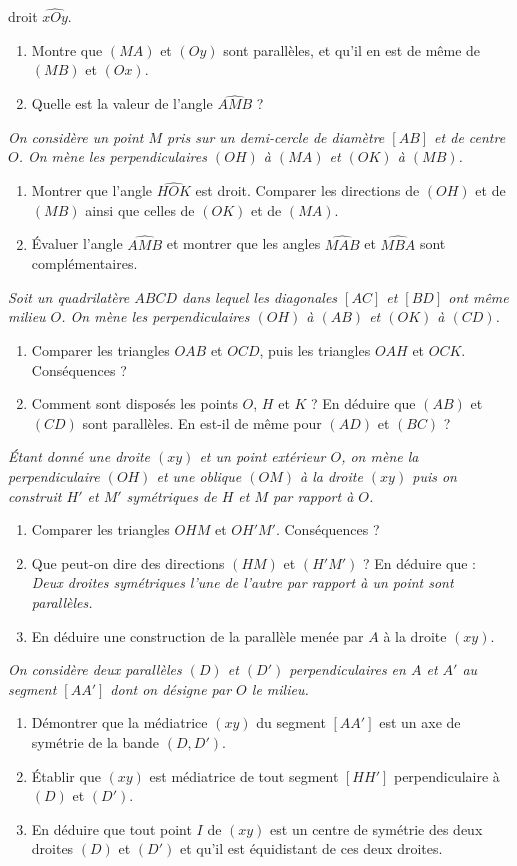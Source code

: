 \begin{itemize}
droit $\widehat{xOy}$.
\begin{enumerate}
\item Montre que $(MA)$ et $(Oy)$ sont parallèles, et qu'il en est de même de $(MB)$ et $(Ox)$.
\item Quelle est la valeur de l'angle $\widehat{AMB}$ ?
\end{enumerate}
\it On considère un point $M$ pris sur un demi-cercle de diamètre $[AB]$ et de centre $O$. On mène les perpendiculaires $(OH)$ à $(MA)$ et $(OK)$ à $(MB)$.
\begin{enumerate}
\item Montrer que l'angle $\widehat{HOK}$ est droit. Comparer les directions de $(OH)$ et de $(MB)$ ainsi que celles de $(OK)$ et de $(MA)$.
\item Évaluer l'angle $\widehat{AMB}$ et montrer que les angles $\widehat{MAB}$ et $\widehat{MBA}$ sont complémentaires.
\end{enumerate}
\it Soit un quadrilatère $ABCD$ dans lequel les diagonales $[AC]$ et $[BD]$ ont même milieu $O$. On mène les perpendiculaires $(OH)$ à $(AB)$ et $(OK)$ à
$(CD)$. \begin{enumerate}
\item Comparer les triangles $OAB$ et $OCD$, puis les triangles $OAH$ et $OCK$. Conséquences ?
\item Comment sont disposés les points $O$, $H$ et $K$ ? En déduire que $(AB)$ et $(CD)$ sont parallèles. En est-il de même pour $(AD)$ et $(BC)$ ?
\end{enumerate}
\it Étant donné une droite $(xy)$ et un point extérieur $O$, on mène la perpendiculaire $(OH)$ et une oblique $(OM)$ à la droite $(xy)$ puis on construit $H'$ et $M'$ symétriques de $H$ et $M$ par rapport à $O$. \begin{enumerate}
\item Comparer les triangles $OHM$ et $OH'M'$. Conséquences ?
\item Que peut-on dire des directions $(HM)$ et $(H'M')$ ? En déduire que : \\
\emph{Deux droites symétriques l'une de l'autre par rapport à un point sont parallèles.}
\item En déduire une construction de la parallèle menée par $A$ à la droite $(xy)$.
\end{enumerate}
\it On considère deux parallèles $(D)$ et $(D')$ perpendiculaires en $A$ et $A'$ au segment $[AA']$ dont on désigne par $O$ le milieu.\begin{enumerate}
\item Démontrer que la médiatrice $(xy)$ du segment $[AA']$ est un axe de symétrie de la bande $(D, D')$.
\item Établir que $(xy)$ est médiatrice de tout segment $[HH']$ perpendiculaire à $(D)$ et $(D')$.
\item En déduire que tout point $I$ de $(xy)$ est un centre de symétrie des deux droites $(D)$ et $(D')$ et qu'il est équidistant de ces deux droites.
\end{enumerate}
\end{itemize}